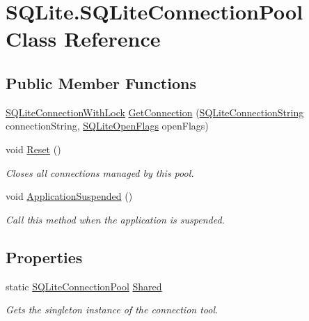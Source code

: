 \hypertarget{class_s_q_lite_1_1_s_q_lite_connection_pool}{\section{S\+Q\+Lite.\+S\+Q\+Lite\+Connection\+Pool Class Reference}
\label{class_s_q_lite_1_1_s_q_lite_connection_pool}
}
\subsection*{Public Member Functions}
\begin{DoxyCompactItemize}
\item 
\hyperlink{class_s_q_lite_1_1_s_q_lite_connection_with_lock}{S\+Q\+Lite\+Connection\+With\+Lock} \hyperlink{class_s_q_lite_1_1_s_q_lite_connection_pool_a956aa90143a106ef4344ac2a77bfeefc}{Get\+Connection} (\hyperlink{class_s_q_lite_1_1_s_q_lite_connection_string}{S\+Q\+Lite\+Connection\+String} connection\+String, \hyperlink{namespace_s_q_lite_a9d72cc097c53dbc96a6f0eec530cc439}{S\+Q\+Lite\+Open\+Flags} open\+Flags)
\item 
void \hyperlink{class_s_q_lite_1_1_s_q_lite_connection_pool_a06bf58eb2050f2bb058c5bbfe76fab5e}{Reset} ()
\begin{DoxyCompactList}\small\item\em Closes all connections managed by this pool. \end{DoxyCompactList}\item 
void \hyperlink{class_s_q_lite_1_1_s_q_lite_connection_pool_a1ad83ea08efbe20c5f596d82977fffe9}{Application\+Suspended} ()
\begin{DoxyCompactList}\small\item\em Call this method when the application is suspended. \end{DoxyCompactList}\end{DoxyCompactItemize}
\subsection*{Properties}
\begin{DoxyCompactItemize}
\item 
static \hyperlink{class_s_q_lite_1_1_s_q_lite_connection_pool}{S\+Q\+Lite\+Connection\+Pool} \hyperlink{class_s_q_lite_1_1_s_q_lite_connection_pool_aaa23c37a087e3e04c4af6a69ce7cfb97}{Shared}
\begin{DoxyCompactList}\small\item\em Gets the singleton instance of the connection tool. \end{DoxyCompactList}\end{DoxyCompactItemize}


